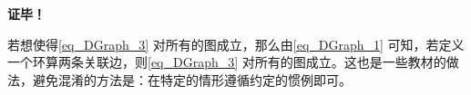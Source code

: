 \textbf{证毕！}

若想使得\autoref{eq_DGraph_3} 对所有的图成立，那么由\autoref{eq_DGraph_1} 可知，若定义一个环算两条关联边，则\autoref{eq_DGraph_3} 对所有的图成立。这也是一些教材的做法，避免混淆的方法是：在特定的情形遵循约定的惯例即可。










